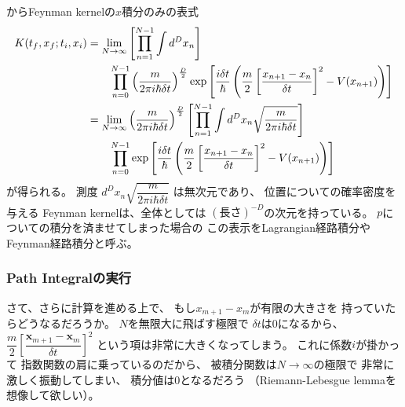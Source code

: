 からFeynman kernelの$x$積分のみの表式
\begin{align}
    K( t_f, x_f ; t_i, x_i )
    &=
    \lim_{ N \to \infty }
    \left[
        \prod_{n=1}^{N-1}
        \int d^D x_n
    \right]
\notag\\&\qquad
    \prod_{n=0}^{N-1}
    \left(
        \dfrac{m}{ 2 \pi i \hbar \delta t }
    \right)^{\frac{D}{2}}
    \exp\left[
        \dfrac{ i \delta t }{\hbar}
        \left(
            \dfrac{m}{2}
            \left[
                \dfrac{
                    x_{n+1}
                -
                    x_{n}    
                }{\delta t}
            \right]^2
        -
            V( x_{n+1} )
        \right)
    \right]
\notag\\&=
    \lim_{ N \to \infty }
    \left(
        \dfrac{m}{ 2 \pi i \hbar \delta t }
    \right)^{\frac{D}{2}}
    \left[
        \prod_{n=1}^{N-1}
        \int
        d^D x_n
        \sqrt{
            \dfrac{m}{2 \pi i \hbar \delta t}
        }
    \right]
\notag\\&\qquad
    \prod_{n=0}^{N-1}
    \exp\left[
        \dfrac{ i \delta t }{\hbar}
        \left(
            \dfrac{m}{2}
            \left[
                \dfrac{
                    x_{n+1}
                -
                    x_{n}    
                }{\delta t}
            \right]^2
        -
            V( x_{n+1} )
        \right)
    \right]
\end{align}
が得られる。
測度
$d^D x_n
\sqrt{
    \dfrac{m}{2 \pi i \hbar \delta t}
}
$
は無次元であり、
位置についての確率密度を与える
Feynman kernelは、全体としては
$(\text{長さ})^{-D}$の次元を持っている。
$p$についての積分を済ませてしまった場合の
この表示をLagrangian経路積分や
Feynman経路積分と呼ぶ。

\subsubsection{Path Integralの実行}

さて、さらに計算を進める上で、
もし$x_{m+1} - x_{m}$が有限の大きさを
持っていたらどうなるだろうか。
$N$を無限大に飛ばす極限で
$\delta t$は$0$になるから、
$
    \dfrac{m}{2}
    \left[
        \dfrac{
            \bm{x}_{m+1} - \bm{x}_{m}
        }{\delta t}
    \right]^2
$
という項は非常に大きくなってしまう。
これに係数$i$が掛かって
指数関数の肩に乗っているのだから、
被積分関数は$N \to \infty$の極限で
非常に激しく振動してしまい、
積分値は$0$となるだろう
（Riemann-Lebesgue lemmaを想像して欲しい）。

